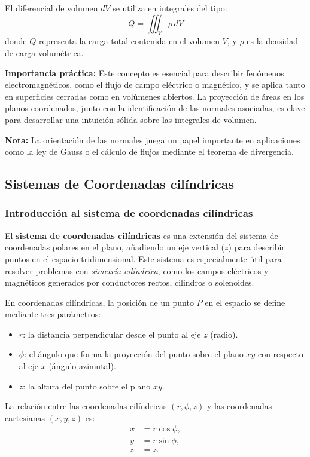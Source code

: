 \documentclass{book}
\begin{document}
El diferencial de volumen $dV$ se utiliza en integrales del tipo:
\begin{equation}
Q = \iiint_V \rho\,dV
\end{equation}
donde $Q$ representa la carga total contenida en el volumen $V$, y $\rho$ es la densidad de carga volumétrica.

\textbf{Importancia práctica:} Este concepto es esencial para describir fenómenos electromagnéticos, como el flujo de campo eléctrico o magnético, y se aplica tanto en superficies cerradas como en volúmenes abiertos. La proyección de áreas en los planos coordenados, junto con la identificación de las normales asociadas, es clave para desarrollar una intuición sólida sobre las integrales de volumen.

\textbf{Nota:} La orientación de las normales juega un papel importante en aplicaciones como la ley de Gauss o el cálculo de flujos mediante el teorema de divergencia.

\subsection{Sistemas de Coordenadas cilíndricas}

\subsubsection{Introducción al sistema de coordenadas cilíndricas}

El \textbf{sistema de coordenadas cilíndricas} es una extensión del sistema de coordenadas polares en el plano, añadiendo un eje vertical ($z$) para describir puntos en el espacio tridimensional. Este sistema es especialmente útil para resolver problemas con \textit{simetría cilíndrica}, como los campos eléctricos y magnéticos generados por conductores rectos, cilindros o solenoides.

En coordenadas cilíndricas, la posición de un punto $P$ en el espacio se define mediante tres parámetros:
\begin{itemize}
    \item $r$: la distancia perpendicular desde el punto al eje $z$ (radio).
    \item $\phi$: el ángulo que forma la proyección del punto sobre el plano $xy$ con respecto al eje $x$ (ángulo azimutal).
    \item $z$: la altura del punto sobre el plano $xy$.
\end{itemize}

La relación entre las coordenadas cilíndricas $(r, \phi, z)$ y las coordenadas cartesianas $(x, y, z)$ es:
\begin{align}
x &= r \cos\phi, \\
y &= r \sin\phi, \\
z &= z.
\end{align}
\end{document}
